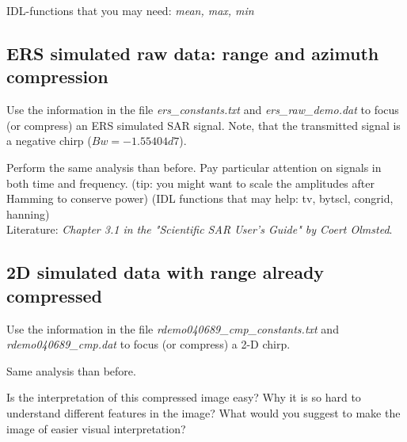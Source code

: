 IDL-functions that you may need: \textit{mean, max, min}


\subsection{ERS simulated raw data: range and azimuth compression}
Use the information in the file \textit{ers\_constants.txt} and \textit{ers\_raw\_demo.dat} to focus (or compress) an ERS simulated SAR signal. Note, that the transmitted signal is a negative chirp ($Bw = -1.55404d7$).

Perform the same analysis than before. Pay particular attention on signals in both time and frequency.
(tip: you might want to scale the amplitudes after Hamming to conserve power)
(IDL functions that may help: tv, bytscl, congrid, hanning)\\
Literature: \textit{Chapter 3.1 in the "Scientific SAR User's Guide" by Coert Olmsted}.


\subsection{2D simulated data with range already compressed}
Use the information in the file \textit{rdemo040689\_cmp\_constants.txt} and \textit{rdemo040689\_cmp.dat} to focus (or compress) a 2-D chirp.

Same analysis than before. 

Is the interpretation of this compressed image easy? Why it is so hard to understand different features in the image? What would you suggest to make the image of easier visual interpretation?
